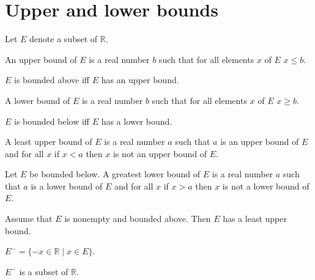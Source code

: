 \documentclass{article}
\begin{document}
\section{Upper and lower bounds}

\begin{forthel}

Let $E$ denote a subset of $\mathbb{R}$.

\begin{definition}[1 7]
An upper bound of $E$ is a
real number $b$ such that for all elements $x$ of $E$ $x \leq b$.
\end{definition}

\begin{definition}[1 7a]
$E$ is bounded above iff
$E$ has an upper bound.
\end{definition}

\begin{definition}[1 7b]
A lower bound of $E$ is a
real number $b$ such that for all elements $x$ of $E$ $x \geq b$.
\end{definition}

\begin{definition}[1 7c]
$E$ is bounded below iff
$E$ has a lower bound.
\end{definition}

\begin{definition}[1 8]
A least upper bound of $E$ is a real number $a$ such that
$a$ is an upper bound of $E$ and for all $x$ if $x < a$ then $x$
is not an upper bound of $E$.
\end{definition}

\begin{definition}[1 8a]
Let $E$ be bounded below.
A greatest lower bound of $E$ is a real number $a$ such that
$a$ is a lower bound of $E$ and for all $x$ if $x > a$ then $x$ is
not a lower bound of $E$.
\end{definition}

\begin{axiom}[1 19]
Assume that $E$ is nonempty and bounded above.
Then $E$ has a least upper bound.
\end{axiom}

\begin{definition}
$E^- = \{-x \in \mathbb{R} \mid x \in E\}$.
\end{definition}

\begin{lemma}
$E^-$ is a subset of $\mathbb{R}$.
\end{lemma}


\end{forthel}
\end{document}
